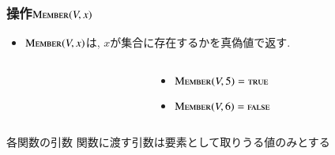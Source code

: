 \documentclass[main]{subfiles}
\begin{document}
\begin{frame}\frametitle{操作$\mathrm{\text{M\textsc{ember}}}(V,x)$}
\begin{itemize}
\item $\mathrm{\text{M\textsc{ember}}}(V,x)$は, $x$が集合に存在するかを真偽値で返す.\\
\end{itemize}
\begin{columns}[c]
	\begin{column}{0.5\linewidth}
		
	\end{column}
	\begin{column}{0.49\linewidth}
		\begin{itemize}
			\item $\mathrm{\text{M\textsc{ember}}}(V,5) = \text{\textsc{true}}$\\
			\item $\mathrm{\text{M\textsc{ember}}}(V,6) = \text{\textsc{false}}$\\
		\end{itemize}
	\end{column}
\end{columns}
\begin{alertblock}{各関数の引数}
関数に渡す引数は要素として取りうる値のみとする
\end{alertblock}
\end{frame}
\end{document}
